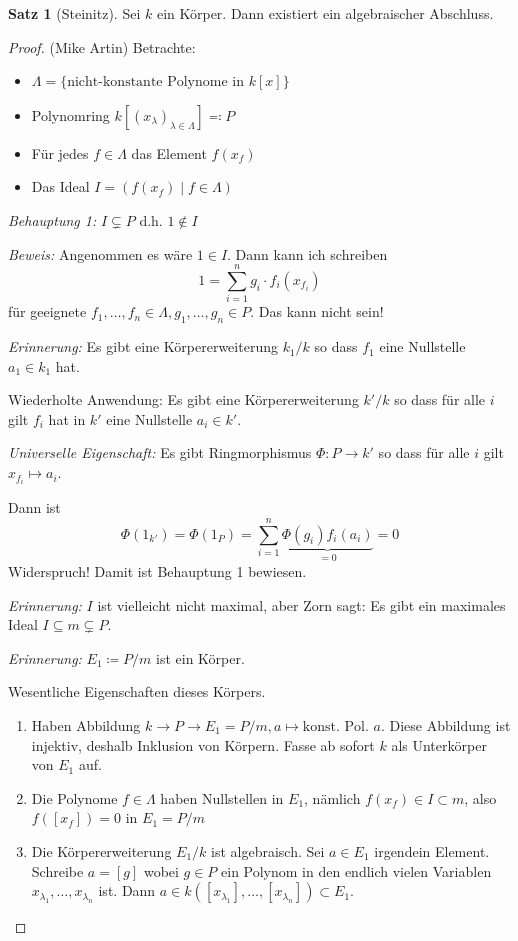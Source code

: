 \documentclass[12pt,parskip=full]{scrartcl}
\theoremstyle{definition}
\newtheorem{theorem}{Satz}[section]
\theoremstyle{remark}
\begin{document}
	\begin{theorem}[Steinitz]
		Sei $k$ ein Körper. Dann existiert ein algebraischer Abschluss.
	\end{theorem}

	\begin{proof}(Mike Artin)
		Betrachte:
		\begin{itemize}
			\item $\Lambda = \{ \text{nicht-konstante Polynome in $k[x]$} \}$
			\item Polynomring $k[(x_\lambda)_{\lambda \in \Lambda}] \eqqcolon P$
			\item Für jedes $f \in \Lambda$ das Element $f(x_f)$
			\item Das Ideal $I = (f(x_f) \mid f \in \Lambda)$
		\end{itemize}
		\textit{Behauptung 1:} $I \subsetneq P$ d.h. $1 \notin I$
		
		\textit{Beweis:} Angenommen es wäre $1 \in I$. Dann kann ich schreiben
		\begin{equation*}
			1 = \sum_{i=1}^n g_i \cdot f_i(x_{f_i})
		\end{equation*}
		für geeignete $f_1, \dots, f_n \in \Lambda, g_1, \dots, g_n \in P$. Das kann nicht sein!
		
		\textit{Erinnerung:} Es gibt eine Körpererweiterung $k_1 / k$ so dass $f_1$ eine Nullstelle $a_1 \in k_1$ hat.
		
		Wiederholte Anwendung: Es gibt eine Körpererweiterung $k' /  k$ so dass für alle $i$ gilt $f_i$ hat in $k'$ eine Nullstelle $a_i \in k'$.
		
		\textit{Universelle Eigenschaft:} Es gibt Ringmorphismus $\Phi: P \to k'$ so dass für alle $i$ gilt $x_{f_i} \mapsto a_i$.
		
		Dann ist
		\begin{equation*}
			\Phi(1_{k'}) = \Phi(1_P) = \sum_{i = 1}^n \underbrace{\Phi(g_i) f_i(a_i)}_{=0} = 0
		\end{equation*}
		Widerspruch! Damit ist Behauptung 1 bewiesen.
		
		\textit{Erinnerung:} $I$ ist vielleicht nicht maximal, aber Zorn sagt: Es gibt ein maximales Ideal $I \subseteq m \subsetneq P$.
		
		\textit{Erinnerung:} $E_1 \coloneqq P/m$ ist ein Körper.
		
		Wesentliche Eigenschaften dieses Körpers.
		\begin{enumerate}
			\item Haben Abbildung $k \to P \to E_1 = P/m, a \mapsto \text{konst. Pol. $a$}$. Diese Abbildung ist injektiv, deshalb Inklusion von Körpern. Fasse ab sofort $k$ als Unterkörper von $E_1$ auf.
			\item Die Polynome $f \in \Lambda$ haben Nullstellen in $E_1$, nämlich $f(x_f) \in I \subset m$, also $f([x_f]) = 0$ in $E_1 = P / m$
			\item Die Körpererweiterung $E_1 / k$ ist algebraisch. Sei $a \in E_1$ irgendein Element. Schreibe $a = [g]$ wobei $g \in P$ ein Polynom in den endlich vielen Variablen $x_{\lambda_1}, \dots, x_{\lambda_n}$ ist.
			Dann $a \in k([x_{\lambda_1}], \dots, [x_{\lambda_n}]) \subset E_1$.
			

\end{enumerate}
\end{proof}
\end{document}
